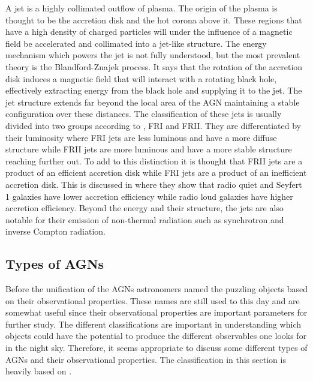 A jet is a highly collimated outflow of plasma. The origin of the plasma is thought to be the accretion disk and the hot corona above it. These regions that have a high density of charged particles will under the influence of a magnetic field be accelerated and collimated into a jet-like structure.
The energy mechanism which powers the jet is not fully understood, but the most prevalent theory is the Blandford-Znajek process. It says that the rotation of the accretion disk induces a magnetic field that will interact with a rotating black hole, effectively extracting energy from the black hole and supplying it to the jet. 
The jet structure extends far beyond the local area of the AGN maintaining a stable configuration over these distances. The classification of these jets is usually divided into two groups according to \cite{walg2013relativistic}, FRI and FRII. They are differentiated by their luminosity where FRI jets are less luminous and have a more diffuse structure while FRII jets are more luminous and have a more stable structure reaching further out.
To add to this distinction it is thought that FRII jets are a product of an efficient accretion disk while FRI jets are a product of an inefficient accretion disk. This is discussed in \cite{Wei-Hao_2003} where they show that radio quiet and Seyfert 1 galaxies have lower accretion efficiency while radio loud galaxies have higher accretion efficiency. 
Beyond the energy and their structure, the jets are also notable for their emission of non-thermal radiation such as synchrotron and inverse Compton radiation. %







\subsection{Types of AGNs}

Before the unification of the AGNs astronomers named the puzzling objects based on their observational properties. These 
names are still used to this day and are somewhat useful since their observational properties are important parameters for further study. 
The different classifications are important in understanding which objects could have the potential to produce the different observables one 
looks for in the night sky. Therefore, it seems appropriate to
discuss some different types of AGNs and their observational properties. The classification in this section is heavily based on \cite{Astrobites}.

